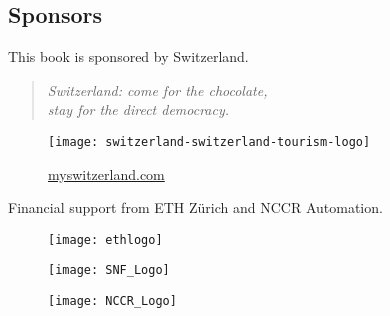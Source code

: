 
\vfill
\subsection{Sponsors}

This book is sponsored by Switzerland.

\begin{quote}\centering
    \itshape
    Switzerland: come for the chocolate,\\
    stay for the direct democracy.
\end{quote}

\begin{figure}[h]
    \centering
    \texttt{[image: switzerland-switzerland-tourism-logo]}

    \href{http://myswitzerland.com}{myswitzerland.com}
\end{figure}


Financial support from ETH Zürich and NCCR Automation.
\begin{figure}[h]
    \centering
    \texttt{[image: ethlogo]}
\end{figure}

\begin{figure}[h]
    \centering
    \texttt{[image: SNF\_Logo]}
\end{figure}

\begin{figure}[h]
    \centering
    \texttt{[image: NCCR\_Logo]}
\end{figure}


\vfill